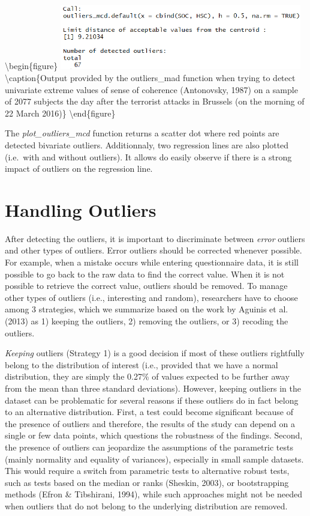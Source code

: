 \documentclass[man,floatsintext]{apa6}
\begin{document}
\textbackslash{}begin\{figure\}
\includegraphics[width=400px]{Rmarkdown folder/Fig 5} \textbackslash{}caption\{Output provided by the outliers\_mad function when trying to detect univariate extreme values of sense of coherence (Antonovsky, 1987) on a sample of 2077 subjects the day after the terrorist attacks in Brussels (on the morning of 22 March 2016)\}\label{fig:unnamed-chunk-2}
\textbackslash{}end\{figure\}

The \emph{plot\_outliers\_mcd} function returns a scatter dot where red points are detected bivariate outliers. Additionnaly, two regression lines are also plotted (i.e.~with and without outliers). It allows do easily observe if there is a strong impact of outliers on the regression line.

\hypertarget{handling-outliers}{%
\section{Handling Outliers}\label{handling-outliers}}

After detecting the outliers, it is important to discriminate between \emph{error} outliers and other types of outliers. Error outliers should be corrected whenever possible. For example, when a mistake occurs while entering questionnaire data, it is still possible to go back to the raw data to find the correct value. When it is not possible to retrieve the correct value, outliers should be removed. To manage other types of outliers (i.e., interesting and random), researchers have to choose among 3 strategies, which we summarize based on the work by Aguinis et al. (2013) as 1) keeping the outliers, 2) removing the outliers, or 3) recoding the outliers.

\emph{Keeping} outliers (Strategy 1) is a good decision if most of these outliers rightfully belong to the distribution of interest (i.e., provided that we have a normal distribution, they are simply the 0.27\% of values expected to be further away from the mean than three standard deviations). However, keeping outliers in the dataset can be problematic for several reasons if these outliers do in fact belong to an alternative distribution. First, a test could become significant because of the presence of outliers and therefore, the results of the study can depend on a single or few data points, which questions the robustness of the findings. Second, the presence of outliers can jeopardize the assumptions of the parametric tests (mainly normality and equality of variances), especially in small sample datasets. This would require a switch from parametric tests to alternative robust tests, such as tests based on the median or ranks (Sheskin, 2003), or bootstrapping methods (Efron \& Tibshirani, 1994), while such approaches might not be needed when outliers that do not belong to the underlying distribution are removed.
\end{document}
